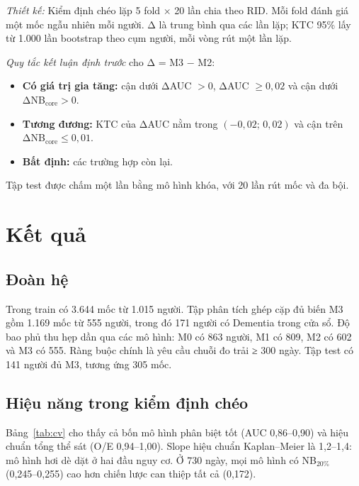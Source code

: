 \documentclass[conference]{IEEEtran}
\begin{document}
\textit{Thiết kế:} Kiểm định chéo lặp 5 fold × 20 lần chia theo RID. Mỗi fold đánh giá một mốc ngẫu nhiên mỗi người. Δ là trung bình qua các lần lặp; KTC 95\% lấy từ 1.000 lần bootstrap theo cụm người, mỗi vòng rút một lần lặp.

\textit{Quy tắc kết luận định trước} cho Δ = M3 − M2:
\begin{itemize}
\item \textbf{Có giá trị gia tăng:} cận dưới ΔAUC $>0$, ΔAUC $\ge 0{,}02$ và cận dưới ΔNB$_{\text{core}}>0$.
\item \textbf{Tương đương:} KTC của ΔAUC nằm trong $(-0{,}02;\,0{,}02)$ và cận trên ΔNB$_{\text{core}}\le 0{,}01$.
\item \textbf{Bất định:} các trường hợp còn lại.
\end{itemize}
Tập test được chấm một lần bằng mô hình khóa, với 20 lần rút mốc và đa bội.

\section{Kết quả}
\subsection{Đoàn hệ}
Trong train có 3.644 mốc từ 1.015 người. Tập phân tích ghép cặp đủ biến M3 gồm 1.169 mốc từ 555 người, trong đó 171 người có Dementia trong cửa sổ. Độ bao phủ thu hẹp dần qua các mô hình: M0 có 863 người, M1 có 809, M2 có 602 và M3 có 555. Ràng buộc chính là yêu cầu chuỗi đo trải ≥ 300 ngày. Tập test có 141 người đủ M3, tương ứng 305 mốc.

\subsection{Hiệu năng trong kiểm định chéo}
Bảng~\ref{tab:cv} cho thấy cả bốn mô hình phân biệt tốt (AUC 0,86–0,90) và hiệu chuẩn tổng thể sát (O/E 0,94–1,00). Slope hiệu chuẩn Kaplan–Meier là 1,2–1,4: mô hình hơi dè dặt ở hai đầu nguy cơ. Ở 730 ngày, mọi mô hình có NB$_{20\%}$ (0,245–0,255) cao hơn chiến lược can thiệp tất cả (0,172).
\end{document}
